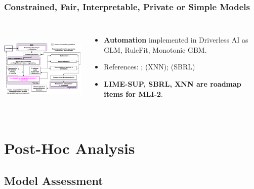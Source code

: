 \documentclass[11pt,
               aspectratio=169,
               hyperref={colorlinks}
               ]{beamer}
\begin{document}
			\begin{frame}
		
				\frametitle{Constrained, Fair, Interpretable, Private or Simple Models}		
			
				\begin{columns}
	
					\centering
					\includegraphics[height=120pt]{img/im.png}
				
					\vspace{-5pt}
					\begin{itemize}
						\item \textbf{Automation} implemented in Driverless AI as GLM, RuleFit, Monotonic GBM.
						\item References: ;  (XNN); 	 (SBRL)		
						\item \textbf{LIME-SUP, SBRL, XNN are roadmap items for MLI-2}.
					\end{itemize}
				
				\end{columns}			
			
			\end{frame}

	\section{Post-Hoc Analysis}

		\subsection{Model Assessment}
\end{document}
